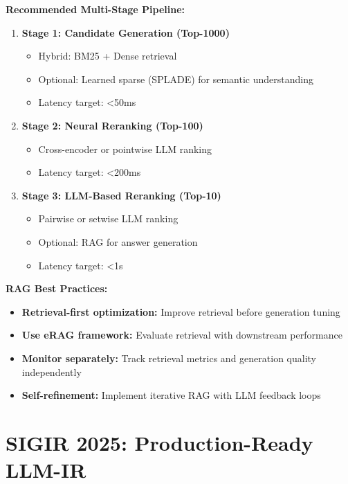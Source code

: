 \documentclass[11pt,letterpaper]{article}
\begin{document}
\textbf{Recommended Multi-Stage Pipeline:}
\begin{enumerate}[leftmargin=*]
    \item \textbf{Stage 1: Candidate Generation (Top-1000)}
    \begin{itemize}
        \item Hybrid: BM25 + Dense retrieval
        \item Optional: Learned sparse (SPLADE) for semantic understanding
        \item Latency target: <50ms
    \end{itemize}

    \item \textbf{Stage 2: Neural Reranking (Top-100)}
    \begin{itemize}
        \item Cross-encoder or pointwise LLM ranking
        \item Latency target: <200ms
    \end{itemize}

    \item \textbf{Stage 3: LLM-Based Reranking (Top-10)}
    \begin{itemize}
        \item Pairwise or setwise LLM ranking
        \item Optional: RAG for answer generation
        \item Latency target: <1s
    \end{itemize}
\end{enumerate}

\textbf{RAG Best Practices:}
\begin{itemize}[leftmargin=*]
    \item \textbf{Retrieval-first optimization:} Improve retrieval before generation tuning
    \item \textbf{Use eRAG framework:} Evaluate retrieval with downstream performance
    \item \textbf{Monitor separately:} Track retrieval metrics and generation quality independently
    \item \textbf{Self-refinement:} Implement iterative RAG with LLM feedback loops
\end{itemize}

\newpage

\section{\textcolor{year2025}{SIGIR 2025: Production-Ready LLM-IR}}
\end{document}
